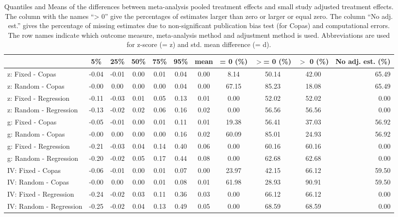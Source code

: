 \documentclass[11pt,a4paper,twoside]{book}\usepackage[]{graphicx}\usepackage[]{color}
\begin{document}
\begin{table}[ht]
\centering
\begingroup\scriptsize
\begin{tabular}{lcccccccccr}
  \hline
 & 5\% & 25\% & 50\% & 75\% & 95\% & mean & = 0 (\%) & $>$= 0 (\%) & $>$ 0 (\%) & No adj. est. (\%) \\ 
  \hline
z: Fixed - Copas & -0.04 & -0.01 & 0.00 & 0.01 & 0.04 & 0.00 & 8.14 & 50.14 & 42.00 & 65.49 \\ 
  z: Random - Copas & -0.00 & 0.00 & 0.00 & 0.00 & 0.04 & 0.00 & 67.15 & 85.23 & 18.08 & 65.49 \\ 
  z: Fixed - Regression & -0.11 & -0.03 & 0.01 & 0.05 & 0.13 & 0.01 & 0.00 & 52.02 & 52.02 & 0.00 \\ 
  z: Random - Regression & -0.13 & -0.02 & 0.02 & 0.06 & 0.16 & 0.02 & 0.00 & 56.56 & 56.56 & 0.00 \\ 
  g: Fixed - Copas & -0.05 & -0.01 & 0.00 & 0.01 & 0.11 & 0.01 & 19.38 & 56.41 & 37.03 & 56.92 \\ 
  g: Random - Copas & -0.00 & 0.00 & 0.00 & 0.00 & 0.16 & 0.02 & 60.09 & 85.01 & 24.93 & 56.92 \\ 
  g: Fixed - Regression & -0.21 & -0.03 & 0.04 & 0.14 & 0.40 & 0.06 & 0.00 & 60.16 & 60.16 & 0.00 \\ 
  g: Random - Regression & -0.20 & -0.02 & 0.05 & 0.17 & 0.44 & 0.08 & 0.00 & 62.68 & 62.68 & 0.00 \\ 
  IV: Fixed - Copas & -0.06 & -0.01 & 0.00 & 0.01 & 0.07 & 0.00 & 23.97 & 42.15 & 66.12 & 59.50 \\ 
  IV: Random - Copas & -0.00 & 0.00 & 0.00 & 0.01 & 0.08 & 0.01 & 61.98 & 28.93 & 90.91 & 59.50 \\ 
  IV: Fixed - Regression & -0.24 & -0.02 & 0.03 & 0.11 & 0.36 & 0.03 & 0.00 & 66.12 & 66.12 & 0.00 \\ 
  IV: Random - Regression & -0.25 & -0.02 & 0.04 & 0.13 & 0.49 & 0.05 & 0.00 & 68.59 & 68.59 & 0.00 \\ 
   \hline
\end{tabular}
\endgroup
\caption{Quantiles and Means of the differences between meta-analysis pooled treatment effects and small study adjusted treatment effects. The column with the names ``> 0'' give the percentages of estimates larger than zero or larger or equal zero. The column ``No adj. est.'' gives the percentage of missing estimates due to non-significant publication bias test (for Copas) and computational errors. The row names indicate which outcome measure, meta-analysis method and adjustment method is used. Abbreviations are used for z-score (= z) and std. mean difference (= d).} 
\label{adjustment.difference}
\end{table}
\end{document}
